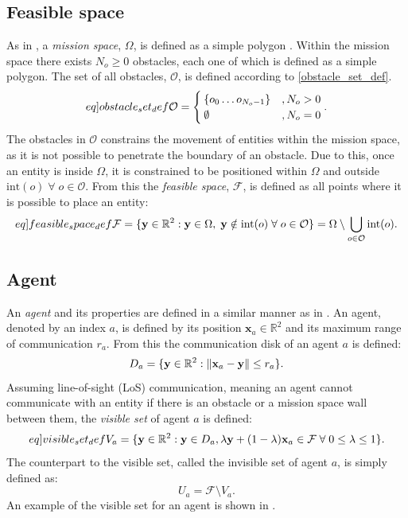 \subsection{Feasible space}
As in \cite{sun2014escaping}, a \textit{mission space}, $\Omega$, is defined as a simple polygon 
\cite{weissteinsimplepolygon}.
Within the mission space there exists $N_{o}\geq 0$ obstacles, each one of which is defined as a simple polygon.
The set of all obstacles, $\mathcal{O}$, is defined according to \eqref{obstacle_set_def}.
\begin{equation}\label[eq]{obstacle_set_def}
  \mathcal{O} = \begin{cases}
    \{o_{0}\hdots o_{N_{o}-1}\} &, N_{o} > 0\\
    \emptyset &, N_{o} = 0\\
  \end{cases}.
\end{equation}
The obstacles in $\mathcal{O}$ constrains the movement of entities within the mission space, as it is not possible to
penetrate the boundary of an obstacle. Due to this, once an entity is inside $\Omega$, it is constrained to be positioned within
$\Omega$ and outside $\mathrm{int}(o)\;\forall\;o\in\mathcal{O}$. From this the \textit{feasible space}, $\mathcal{F}$, is defined as
all points where it is possible to place an entity:
\begin{equation}\label[eq]{feasible_space_def}
  \mathcal{F} = \{\mathbf{y}\in\mathbb{R}^{2}: \mathbf{y}\in\Omega,\;\mathbf{y}\notin\mathrm{int}(o)\;\forall\;o\in\mathcal{O}\} = \Omega\setminus\bigcup_{o\in\mathcal{O}}\mathrm{int}(o).
\end{equation}

\subsection{Agent}
An \textit{agent} and its properties are defined in a similar manner as in \cite{sun2014escaping}.
An agent, denoted by an index $a$, is defined by its position $\mathbf{x}_{a}\in\mathbb{R}^{2}$ and 
its maximum range of communication $r_{a}$. From this the communication disk of an agent $a$ is defined:
\begin{equation}
  D_{a} = \{\mathbf{y}\in\mathbb{R}^{2}: \left\lVert\mathbf{x}_{a} - \mathbf{y}\right\rVert\leq r_{a}\}.
\end{equation}
Assuming line-of-sight (LoS) communication, meaning an agent cannot communicate with an entity if there is 
an obstacle or a mission space wall between them, the \textit{visible set} of agent $a$ is defined:
\begin{equation}\label[eq]{visible_set_def}
  V_{a} = \{\mathbf{y}\in\mathbb{R}^{2}:\mathbf{y}\in D_{a}, \lambda\mathbf{y} + (1-\lambda)\mathbf{x}_{a}\in\mathcal{F}\;\forall\;0\leq\lambda\leq 1\}.
\end{equation}
The counterpart to the visible set, called the invisible set of agent $a$, is simply defined as:
\begin{equation}
  U_{a} = \mathcal{F}\setminus V_{a}.
\end{equation}
An example of the visible set for an agent is shown in .

